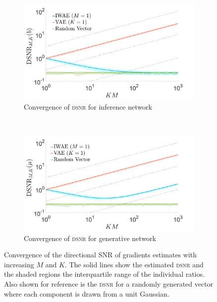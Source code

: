\begin{figure}[t]
	\centering
	\begin{subfigure}[b]{0.4\textwidth}
		\centering
		\includegraphics[width=\textwidth]{figures/tighter_bounds/snr_dir}
		\caption{Convergence of \textsc{dsnr} for inference network\label{fig:snr/snr_dir}}
	\end{subfigure}
~~~~~~~~~~~~~~
	\begin{subfigure}[b]{0.4\textwidth}
		\centering
		\includegraphics[width=\textwidth]{figures/tighter_bounds/snr_dir_mu}
		\caption{Convergence of \textsc{dsnr} for generative network\label{fig:snr/snr_dir_mu}}
	\end{subfigure}\vspace{-6pt}
	\caption{Convergence of the directional \gls{SNR} of gradients estimates with increasing $M$ and $K$.
		The solid lines show the estimated \textsc{dsnr} and the shaded regions the interquartile range of
		the individual ratios.  Also shown for reference is the \textsc{dsnr} for a randomly generated
		vector where each component is drawn from a unit Gaussian.
		\vspace{-10pt}
		\label{fig:snr/extra}}
\end{figure}

